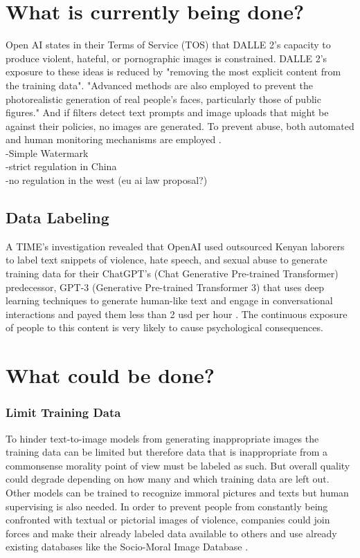 \documentclass[9pt,twocolumn,twoside]{osajnl}
\begin{document}
\section{What is currently being done?}
Open AI states in their Terms of Service (TOS) that DALLE 2's capacity to produce violent, hateful, or pornographic images is constrained. 
DALLE 2's exposure to these ideas is reduced by "removing the most explicit content from the training data". 
"Advanced methods are also employed to prevent the photorealistic generation of real people's faces, particularly those of public figures."
And if filters detect text prompts and image uploads that might be against their policies, no images are generated. To prevent abuse, both automated and human monitoring mechanisms are employed \cite{DallE}. \\
-Simple Watermark\\
-strict regulation in China\\
-no regulation in the west (eu ai law proposal?)\\

\subsection{Data Labeling}
A TIME's investigation revealed that OpenAI used outsourced Kenyan laborers to label text snippets of violence, hate speech, and sexual abuse to generate training data for their ChatGPT’s (Chat Generative Pre-trained Transformer) predecessor, GPT-3 (Generative Pre-trained Transformer 3) that uses deep learning techniques to generate human-like text and engage in conversational interactions and payed them less than 2 usd per hour \cite{KenyaExclusive}. The continuous exposure of people to this content is very likely to cause psychological consequences.

\section{What could be done?}
\subsubsection*{Limit Training Data}
To hinder text-to-image models from generating inappropriate images the training data can be limited but therefore data that is inappropriate from a commonsense morality  point of view must be labeled as such. But overall quality could degrade depending on how many and which training data are left out.\\
Other models can be trained to recognize immoral pictures and texts but human supervising is also needed.
In order to prevent people from constantly being confronted with textual or pictorial images of violence, companies could join forces and make their already labeled data available to others and use already existing databases like the Socio-Moral Image Database \cite{Database}.
\end{document}
